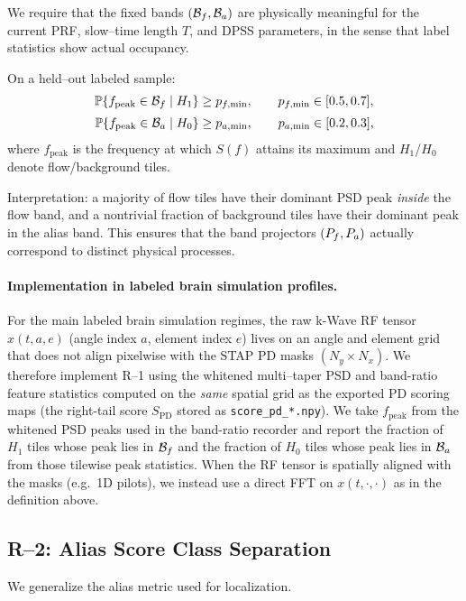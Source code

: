 We require that the fixed bands $(\mathcal{B}_f,\mathcal{B}_a)$ are physically meaningful for the current PRF, slow--time length $T$, and DPSS parameters, in the sense that label statistics show actual occupancy.

On a held--out labeled sample:
\begin{align}
\mathbb{P}\!\left\{f_{\mathrm{peak}}\in\mathcal{B}_f \;\middle|\; H_1\right\} &\ge p_{f,\min},\qquad p_{f,\min}\in [0.5,0.7],\\[0.5ex]
\mathbb{P}\!\left\{f_{\mathrm{peak}}\in\mathcal{B}_a \;\middle|\; H_0\right\} &\ge p_{a,\min},\qquad p_{a,\min}\in [0.2,0.3],
\end{align}
where $f_{\mathrm{peak}}$ is the frequency at which $S(f)$ attains its maximum and $H_1$/$H_0$ denote flow/background tiles.

Interpretation: a majority of flow tiles have their dominant PSD peak \emph{inside} the flow band, and a nontrivial fraction of background tiles have their dominant peak in the alias band. This ensures that the band projectors $(P_f,P_a)$ actually correspond to distinct physical processes.

\paragraph{Implementation in labeled brain simulation profiles.}
For the main labeled brain simulation regimes, the raw k-Wave RF tensor $x(t,a,e)$ (angle index $a$, element index $e$) lives on an angle and element grid that does not align pixelwise with the STAP PD masks $(N_y\times N_x)$. We therefore implement R--1 using the whitened multi--taper PSD and band-ratio feature statistics computed on the \emph{same} spatial grid as the exported PD scoring maps (the right-tail score $S_{\mathrm{PD}}$ stored as \texttt{score\_pd\_*.npy}). We take $f_{\mathrm{peak}}$ from the whitened PSD peaks used in the band-ratio recorder and report the fraction of $H_1$ tiles whose peak lies in $\mathcal{B}_f$ and the fraction of $H_0$ tiles whose peak lies in $\mathcal{B}_a$ from those tilewise peak statistics. When the RF tensor is spatially aligned with the masks (e.g.\ 1D pilots), we instead use a direct FFT on $x(t,\cdot,\cdot)$ as in the definition above.

\subsection{R--2: Alias Score Class Separation}

We generalize the alias metric used for localization.

